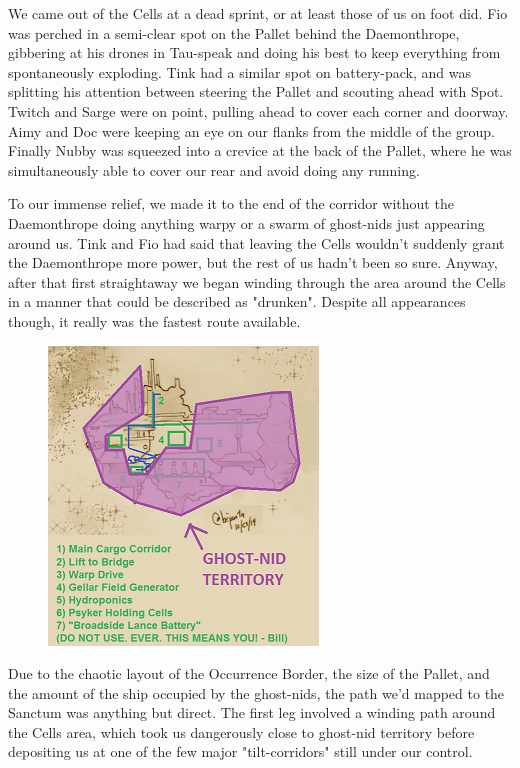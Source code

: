 We came out of the Cells at a dead sprint, or at least those of us on foot did. 
Fio was perched in a semi-clear spot on the Pallet behind the Daemonthrope, gibbering at his drones in Tau-speak and doing his best to keep everything from spontaneously exploding. 
Tink had a similar spot on battery-pack, and was splitting his attention between steering the Pallet and scouting ahead with Spot. 
Twitch and Sarge were on point, pulling ahead to cover each corner and doorway. 
Aimy and Doc were keeping an eye on our flanks from the middle of the group. 
Finally Nubby was squeezed into a crevice at the back of the Pallet, where he was simultaneously able to cover our rear and avoid doing any running.

To our immense relief, we made it to the end of the corridor without the Daemonthrope doing anything warpy or a swarm of ghost-nids just appearing around us. 
Tink and Fio had said that leaving the Cells wouldn't suddenly grant the Daemonthrope more power, but the rest of us hadn't been so sure. 
Anyway, after that first straightaway we began winding through the area around the Cells in a manner that could be described as "drunken". 
Despite all appearances though, it really was the fastest route available.

\begin{figure}
	\begin{center}
		\includegraphics[width=\figwidth]{pics/15/49.png}
	\end{center}
\end{figure}
Due to the chaotic layout of the Occurrence Border, the size of the Pallet, and the amount of the ship occupied by the ghost-nids, the path we'd mapped to the Sanctum was anything but direct. 
The first leg involved a winding path around the Cells area, which took us dangerously close to ghost-nid territory before depositing us at one of the few major "tilt-corridors" still under our control. 


